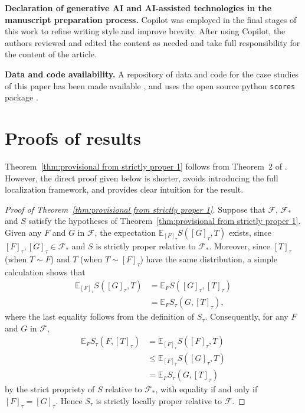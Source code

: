 \documentclass[10pt]{article} %
\theoremstyle{theorem}
\theoremstyle{definition}
\newcommand{\EEE}{\mathbb{E}}
\begin{document}
\vspace{10pt}

\noindent\textbf{Declaration of generative AI and AI-assisted technologies in the manuscript preparation process.} Copilot was employed in the final stages of this work to refine writing style and improve brevity. After using Copilot, the authors reviewed and edited the content as needed and take full responsibility for the content of the article.

\vspace{10pt}

\noindent\textbf{Data and code availability.} A repository of data and code for the case studies of this paper
has been made available \citep{taggart2026code}, and uses the open source python \texttt{scores} package \citep{leeuwenburg2025scores, leeuwenburg2024scores}.


\appendix

\section{Proofs of results}\label{a:proofs}

Theorem~\ref{thm:provisional from strictly proper 1} follows from Theorem~2 of \citet{de2025localizing}. However, the direct proof given below is shorter, avoids introducing the full localization framework, and provides clear intuition for the result.

\begin{proof}[Proof of Theorem~\ref{thm:provisional from strictly proper 1}]
Suppose that $\mathcal{F}$, $\mathcal{F}_*$ and $S$ satisfy the hypotheses of Theorem~\ref{thm:provisional from strictly proper 1}. Given any $F$ and $G$ in $\mathcal{F}$, the expectation $\EEE_{[F]_\tau} S([G]_\tau, T)$ exists, since $[F]_\tau, [G]_\tau \in\mathcal{F}_*$ and $S$ is strictly proper relative to $\mathcal{F}_*$. Moreover, since $[T]_\tau$ (when $T\sim F$) and $T$ (when $T\sim [F]_\tau$) have the same distribution, a simple calculation shows that
\begin{align*}
\EEE_{[F]_\tau} S([G]_\tau, T)
&= \EEE_F S([G]_\tau, [T]_\tau) \\
&= \EEE_F S_\tau(G, [T]_\tau),
\end{align*}
where the last equality follows from the definition of $S_\tau$. Consequently, for any $F$ and $G$ in $\mathcal{F}$,
\begin{align*}
\EEE_F S_\tau(F,[T]_\tau)
&= \EEE_{[F]_\tau} S([F]_\tau, T) \\
&\leq \EEE_{[F]_\tau} S([G]_\tau, T) \\
&= \EEE_{F} S_\tau(G, [T]_\tau)
\end{align*}
by the strict propriety of $S$ relative to $\mathcal{F}_*$, with equality if and only if $[F]_\tau=[G]_\tau$. Hence $S_\tau$ is strictly locally proper relative to $\mathcal{F}$.
\end{proof}
\end{document}

